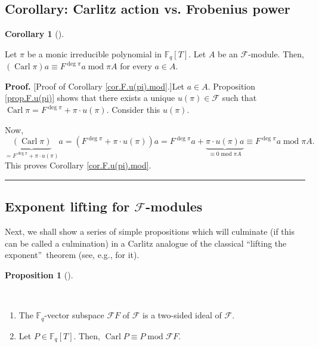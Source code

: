 \documentclass[numbers=enddot,12pt,final,onecolumn,notitlepage]{scrartcl}%
\theoremstyle{definition}
\newtheorem{prop}[theo]{Proposition}
\newenvironment{proposition}[1][]
{\begin{prop}[#1]\begin{leftbar}}
{\end{leftbar}\end{prop}}
\newtheorem{coro}[theo]{Corollary}
\newenvironment{corollary}[1][]
{\begin{coro}[#1]\begin{leftbar}}
{\end{leftbar}\end{coro}}
\newenvironment{proof}[1][Proof]{\noindent\textbf{#1.} }{\ \rule{0.5em}{0.5em}}
\begin{document}
\subsection{Corollary: Carlitz action vs. Frobenius power}

\begin{corollary}
\label{cor.F.u(pi).mod}Let $\pi$ be a monic irreducible polynomial in
$\mathbb{F}_{q}\left[  T\right]  $. Let $A$ be an $\mathcal{F}$-module. Then,
$\left(  \operatorname*{Carl}\pi\right)  a\equiv F^{\deg\pi}%
a\operatorname{mod}\pi A$ for every $a\in A$.
\end{corollary}

\begin{proof}
[Proof of Corollary \ref{cor.F.u(pi).mod}.]Let $a\in A$. Proposition
\ref{prop.F.u(pi)} shows that there exists a unique $u\left(  \pi\right)
\in\mathcal{F}$ such that $\operatorname*{Carl}\pi=F^{\deg\pi}+\pi\cdot
u\left(  \pi\right)  $. Consider this $u\left(  \pi\right)  $.

Now,%
\[
\underbrace{\left(  \operatorname*{Carl}\pi\right)  }_{=F^{\deg\pi}+\pi\cdot
u\left(  \pi\right)  }a=\left(  F^{\deg\pi}+\pi\cdot u\left(  \pi\right)
\right)  a=F^{\deg\pi}a+\underbrace{\pi\cdot u\left(  \pi\right)  a}%
_{\equiv0\operatorname{mod}\pi A}\equiv F^{\deg\pi}a\operatorname{mod}\pi A.
\]
This proves Corollary \ref{cor.F.u(pi).mod}.
\end{proof}

\subsection{Exponent lifting for $\mathcal{F}$-modules}

Next, we shall show a series of simple propositions which will culminate (if
this can be called a culmination) in a Carlitz analogue of the classical
\textquotedblleft lifting the exponent\textquotedblright\ theorem (see, e.g.,
\cite[version with solutions (ancillary file), (13.84.8)]{reiner-hopf} for it).

\begin{proposition}
\label{prop.F.lift.CarlP-P}\ \ 

\begin{enumerate}
\item[\textbf{(a)}] The $\mathbb{F}_{q}$-vector subspace $\mathcal{F}F$ of
$\mathcal{F}$ is a two-sided ideal of $\mathcal{F}$.

\item[\textbf{(b)}] Let $P\in\mathbb{F}_{q}\left[  T\right]  $. Then,
$\operatorname*{Carl}P\equiv P\operatorname{mod}\mathcal{F}F$.
\end{enumerate}
\end{proposition}
\end{document}
